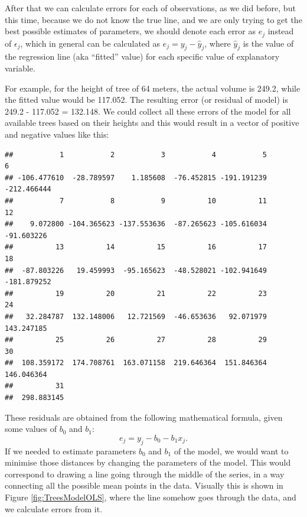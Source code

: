 \documentclass[
]{book}
\theoremstyle{definition}
\theoremstyle{definition}
\theoremstyle{definition}
\theoremstyle{definition}
\theoremstyle{remark}
\begin{document}
After that we can calculate errors for each of observations, as we did before, but this time, because we do not know the true line, and we are only trying to get the best possible estimates of parameters, we should denote each error as \(e_j\) instead of \(\epsilon_j\), which in general can be calculated as \(e_j = y_j - \hat{y}_j\), where \(\hat{y}_j\) is the value of the regression line (aka ``fitted'' value) for each specific value of explanatory variable.

For example, for the height of tree of 64 meters, the actual volume is 249.2, while the fitted value would be 117.052. The resulting error (or residual of model) is 249.2 - 117.052 = 132.148. We could collect all these errors of the model for all available trees based on their heights and this would result in a vector of positive and negative values like this:

\begin{verbatim}
##           1           2           3           4           5           6 
## -106.477610  -28.789597    1.185608  -76.452815 -191.191239 -212.466444 
##           7           8           9          10          11          12 
##    9.072800 -104.365623 -137.553636  -87.265623 -105.616034  -91.603226 
##          13          14          15          16          17          18 
##  -87.803226   19.459993  -95.165623  -48.528021 -102.941649 -181.879252 
##          19          20          21          22          23          24 
##   32.284787  132.148006   12.721569  -46.653636   92.071979  143.247185 
##          25          26          27          28          29          30 
##  108.359172  174.708761  163.071158  219.646364  151.846364  146.046364 
##          31 
##  298.883145
\end{verbatim}

These residuals are obtained from the following mathematical formula, given some values of \(b_0\) and \(b_1\):
\begin{equation}
    e_j = y_j - {b}_0 - {b}_1 x_j.
    \label{eq:SLRFormulaEstimatedError}
\end{equation}
If we needed to estimate parameters \({b}_0\) and \({b}_1\) of the model, we would want to minimise those distances by changing the parameters of the model. This would correspond to drawing a line going through the middle of the series, in a way connecting all the possible mean points in the data. Visually this is shown in Figure \ref{fig:TreesModelOLS}, where the line somehow goes through the data, and we calculate errors from it.
\end{document}
